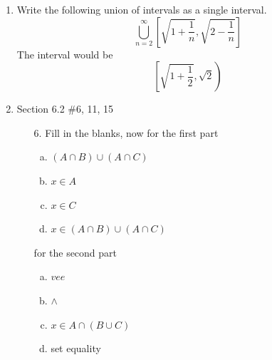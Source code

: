 \documentclass[12pt]{article}
\newcommand{\sqbkt}[1]{\left[ #1 \right]}
\newcommand{\paren}[1]{\left( #1 \right)}
\newcommand{\union}[2]{\bigcup_{#1}^{#2}}
\newcommand{\closeopen}[1]{\left[ #1 \right)}
\begin{document}
\begin{enumerate}
    \item Write the following union of intervals as a single interval.
        \[
        \union{n=2}{\infty} \sqbkt{\sqrt{1 + \frac{1}{n}},\sqrt{2 - \frac{1}{n}}}
        \]
        The interval would be
        \[
        \closeopen{\sqrt{1+\frac{1}{2}}, \sqrt{2}}
        \]
    \newpage
    
    \item Section 6.2 \#6, 11, 15
        \begin{enumerate}
            \item[6.] Fill in the blanks, now for the first part
                \begin{enumerate}[(a)]
                    \item $\paren{A \cap B}\cup \paren{A \cap C}$
                    \item $x \in A$
                    \item $x \in C$
                    \item $ x \in \paren{A \cap B}\cup \paren{A \cap C}$
                \end{enumerate}
                for the second part
                \begin{enumerate}[(a)]
                    \item $vee$
                    \item $\wedge$
                    \item $ x \in A \cap \paren{B \cup C}$
                    \item set equality
                \end{enumerate}
        \end{enumerate}


\end{enumerate}
\end{document}
